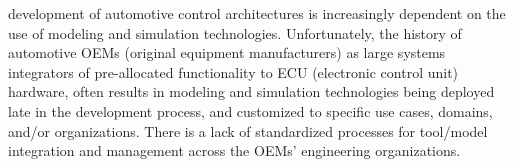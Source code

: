 % 
% 
% 
% 

 development of automotive control architectures is increasingly dependent on the use of modeling and simulation technologies.
Unfortunately, the history of automotive OEMs (original equipment
manufacturers) as large systems integrators of pre-allocated functionality to ECU (electronic control unit) hardware,
often results in modeling and simulation technologies being deployed %
late in the development process,
and customized to specific use cases, domains, and/or organizations.
There is a lack of standardized processes for tool/model integration and management across the OEMs' engineering organizations. 
